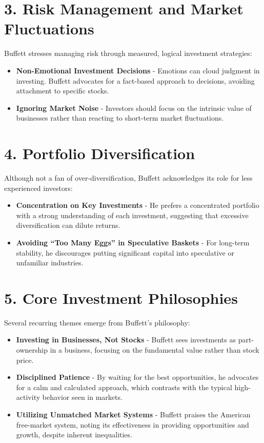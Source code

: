 \documentclass{article}
\begin{document}
\section*{3. Risk Management and Market Fluctuations}
Buffett stresses managing risk through measured, logical investment strategies:

\begin{itemize}
    \item \textbf{Non-Emotional Investment Decisions} - Emotions can cloud judgment in investing. Buffett advocates for a fact-based approach to decisions, avoiding attachment to specific stocks.
    \item \textbf{Ignoring Market Noise} - Investors should focus on the intrinsic value of businesses rather than reacting to short-term market fluctuations.
\end{itemize}

\section*{4. Portfolio Diversification}
Although not a fan of over-diversification, Buffett acknowledges its role for less experienced investors:

\begin{itemize}
    \item \textbf{Concentration on Key Investments} - He prefers a concentrated portfolio with a strong understanding of each investment, suggesting that excessive diversification can dilute returns.
    \item \textbf{Avoiding “Too Many Eggs” in Speculative Baskets} - For long-term stability, he discourages putting significant capital into speculative or unfamiliar industries.
\end{itemize}

\section*{5. Core Investment Philosophies}
Several recurring themes emerge from Buffett’s philosophy:

\begin{itemize}
    \item \textbf{Investing in Businesses, Not Stocks} - Buffett sees investments as part-ownership in a business, focusing on the fundamental value rather than stock price.
    \item \textbf{Disciplined Patience} - By waiting for the best opportunities, he advocates for a calm and calculated approach, which contrasts with the typical high-activity behavior seen in markets.
    \item \textbf{Utilizing Unmatched Market Systems} - Buffett praises the American free-market system, noting its effectiveness in providing opportunities and growth, despite inherent inequalities.
\end{itemize}
\end{document}
